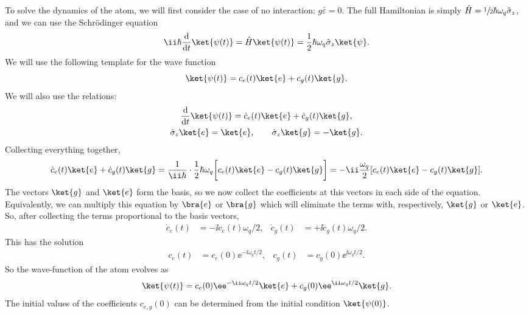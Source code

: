 \documentclass[fontsize=9pt,twoside=semi,bookmarkpackage=false]{scrartcl}
\renewcommand{\hbar}{\hslash}
\begin{document}
To solve the dynamics of the atom, we will first consider the case of no interaction: $g \bar \varepsilon = 0$.
The full Hamiltonian is simply $\hat H = \sfrac 12 \hbar \omega_q \hat \sigma_z$, and we can use the Schrödinger equation
\begin{equation}
  \ii \hbar \diff{}{t } \ket{ \psi (t) } = \hat H \ket{ \psi (t) }
  =
  \frac 12 \hbar \omega_q \hat \sigma_z \ket{ \psi }.
\end{equation}
We will use the following template for the wave function
\begin{equation}
  \ket{ \psi (t) } = c_e (t) \ket{ e } + c_g (t) \ket{ g }.
\end{equation}
We will also use the relations:
\begin{gather}
  \diff{}{t } \ket{ \psi (t) }
  = \dot c_e (t) \ket{ e }
  + \dot c_g (t) \ket{ g },
  \\
  \hat \sigma_z \ket{ e } = \ket{ e },
  \qquad
  \hat \sigma_z \ket{ g } = - \ket{ g }.
\end{gather}
Collecting everything together,
\begin{equation}
  \dot c_e (t) \ket{ e } + \dot c_g (t) \ket {g }
  =
  \frac{ 1 }{ \ii \hbar } \cdot \frac 12 \hbar \omega_q
  \bigg[ c_e (t)\ket{ e } - c_g (t)\ket{ g } \bigg]
  =
  - \ii \frac{ \omega_q }{ 2 } [ c_e (t) \ket{ e } - c_g (t ) \ket { g } ].
\end{equation}
The vectors $\ket{g}$ and $\ket{e}$ form the basis, so we now collect the coefficients at this vectors in each side of the equation.
Equivalently, we can multiply this equation by $\bra{e}$ or $\bra{g}$ which will eliminate the terms with, respectively, $\ket{g}$ or $\ket{e}$.
So, after collecting the terms proportional to the basis vectors,
\begin{align}
  \dot c_e (t) & = - \ii c_e(t) \omega_q / 2 ,
  &
  \dot c_g (t) & = + \ii c_g(t) \omega_q / 2 .
\end{align}
This has the solution
\begin{align}
  c_e (t) & = c_e (0) \ee^{ - \ii \omega_q t / 2 },
  &
  c_g (t) & = c_g (0) \ee^{ \ii \omega_q t / 2 }.
\end{align}
So the wave-function of the atom evolves as
\begin{equation}
  \label{eq:qubit:nocoupling}
  \ket{ \psi (t) }
  =
  c_e (0) \ee^{ - \ii \omega_q t / 2 } \ket{ e }
  +
  c_g (0) \ee^{ \ii \omega_q t / 2 } \ket{ g }.
\end{equation}
The initial values of the coefficients $c_{e,g }(0)$ can be determined from the initial condition $\ket{ \psi (0)}$.
\end{document}
